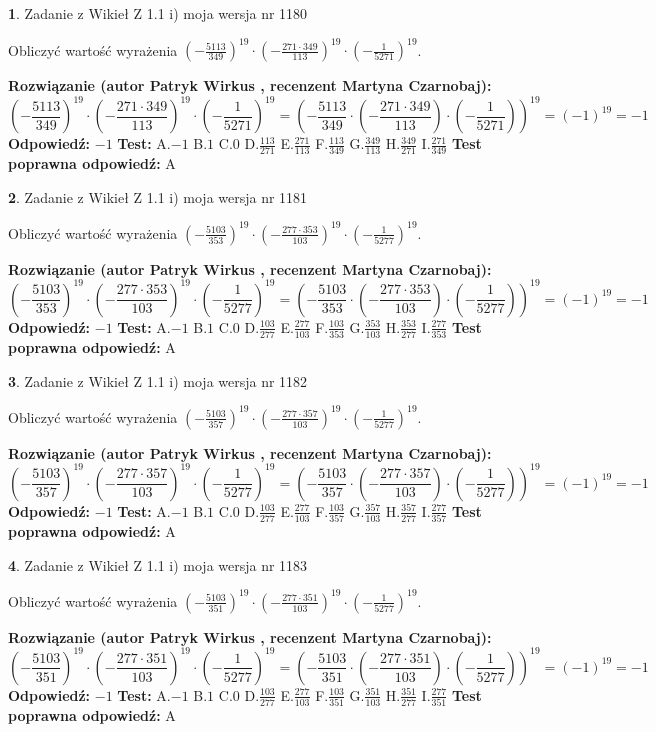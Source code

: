 \documentclass[12pt, a4paper]{article}
\theoremstyle{definition} %
\newtheorem{zad}{}
\newcommand{\zadStart}[1]{\begin{zad}#1\newline}
\newcommand{\zadStop}{\end{zad}}
\newcommand{\rozwStart}[2]{\noindent \textbf{Rozwiązanie (autor #1 , recenzent #2): }\newline}
\newcommand{\rozwStop}{\newline}
\newcommand{\odpStart}{\noindent \textbf{Odpowiedź:}\newline}
\newcommand{\odpStop}{\newline}
\newcommand{\testStart}{\noindent \textbf{Test:}\newline}
\newcommand{\testStop}{\newline}
\newcommand{\kluczStart}{\noindent \textbf{Test poprawna odpowiedź:}\newline}
\newcommand{\kluczStop}{\newline}
\begin{document}
\zadStart{Zadanie z Wikieł Z 1.1 i) moja wersja nr 1180}

Obliczyć wartość wyrażenia $(-\frac{5113}{349})^{19} \cdot (-\frac{271 \cdot 349}{113})^{19} \cdot (-\frac{1}{5271})^{19}$.
\zadStop
\rozwStart{Patryk Wirkus}{Martyna Czarnobaj}
$$(-\frac{5113}{349})^{19} \cdot (-\frac{271 \cdot 349}{113})^{19} \cdot (-\frac{1}{5271})^{19} = (-\frac{5113}{349} \cdot (-\frac{271 \cdot 349}{113}) \cdot (-\frac{1}{5271}))^{19} = (-1)^{19} = -1$$
\rozwStop
\odpStart
$-1$
\odpStop
\testStart
A.$-1$ B.$1$ C.$0$ D.$\frac{113}{271}$ E.$\frac{271}{113}$
F.$\frac{113}{349}$ G.$\frac{349}{113}$
H.$\frac{349}{271}$
I.$\frac{271}{349}$
\testStop
\kluczStart
A
\kluczStop



\zadStart{Zadanie z Wikieł Z 1.1 i) moja wersja nr 1181}

Obliczyć wartość wyrażenia $(-\frac{5103}{353})^{19} \cdot (-\frac{277 \cdot 353}{103})^{19} \cdot (-\frac{1}{5277})^{19}$.
\zadStop
\rozwStart{Patryk Wirkus}{Martyna Czarnobaj}
$$(-\frac{5103}{353})^{19} \cdot (-\frac{277 \cdot 353}{103})^{19} \cdot (-\frac{1}{5277})^{19} = (-\frac{5103}{353} \cdot (-\frac{277 \cdot 353}{103}) \cdot (-\frac{1}{5277}))^{19} = (-1)^{19} = -1$$
\rozwStop
\odpStart
$-1$
\odpStop
\testStart
A.$-1$ B.$1$ C.$0$ D.$\frac{103}{277}$ E.$\frac{277}{103}$
F.$\frac{103}{353}$ G.$\frac{353}{103}$
H.$\frac{353}{277}$
I.$\frac{277}{353}$
\testStop
\kluczStart
A
\kluczStop



\zadStart{Zadanie z Wikieł Z 1.1 i) moja wersja nr 1182}

Obliczyć wartość wyrażenia $(-\frac{5103}{357})^{19} \cdot (-\frac{277 \cdot 357}{103})^{19} \cdot (-\frac{1}{5277})^{19}$.
\zadStop
\rozwStart{Patryk Wirkus}{Martyna Czarnobaj}
$$(-\frac{5103}{357})^{19} \cdot (-\frac{277 \cdot 357}{103})^{19} \cdot (-\frac{1}{5277})^{19} = (-\frac{5103}{357} \cdot (-\frac{277 \cdot 357}{103}) \cdot (-\frac{1}{5277}))^{19} = (-1)^{19} = -1$$
\rozwStop
\odpStart
$-1$
\odpStop
\testStart
A.$-1$ B.$1$ C.$0$ D.$\frac{103}{277}$ E.$\frac{277}{103}$
F.$\frac{103}{357}$ G.$\frac{357}{103}$
H.$\frac{357}{277}$
I.$\frac{277}{357}$
\testStop
\kluczStart
A
\kluczStop



\zadStart{Zadanie z Wikieł Z 1.1 i) moja wersja nr 1183}

Obliczyć wartość wyrażenia $(-\frac{5103}{351})^{19} \cdot (-\frac{277 \cdot 351}{103})^{19} \cdot (-\frac{1}{5277})^{19}$.
\zadStop
\rozwStart{Patryk Wirkus}{Martyna Czarnobaj}
$$(-\frac{5103}{351})^{19} \cdot (-\frac{277 \cdot 351}{103})^{19} \cdot (-\frac{1}{5277})^{19} = (-\frac{5103}{351} \cdot (-\frac{277 \cdot 351}{103}) \cdot (-\frac{1}{5277}))^{19} = (-1)^{19} = -1$$
\rozwStop
\odpStart
$-1$
\odpStop
\testStart
A.$-1$ B.$1$ C.$0$ D.$\frac{103}{277}$ E.$\frac{277}{103}$
F.$\frac{103}{351}$ G.$\frac{351}{103}$
H.$\frac{351}{277}$
I.$\frac{277}{351}$
\testStop
\kluczStart
A
\kluczStop
\end{document}
